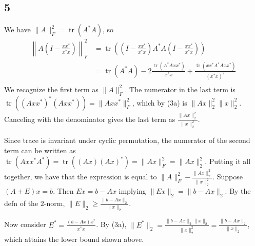 \documentclass{article}
\DeclareMathOperator{\tr}{tr}
\begin{document}
\subsection*{5}
We have $\|A\|_F^2=\tr(A^*A)$, so
\begin{align*}
    \left\|A\left(I-\frac{xx^*}{x^*x}\right)\right\|_F^2&=\tr\left(\left(I-\frac{xx^*}{x^*x}\right)A^*A\left(I-\frac{xx^*}{x^*x}\right)\right)\\
                                                    &=\tr(A^*A)-2\frac{\tr(A^*Axx^*)}{x^*x}+\frac{\tr(xx^*A^*Axx^*)}{(x^*x)^2}\\
\end{align*}
We recognize the first term as $\|A\|_F^2$. The numerator in the last term is $\tr((Axx^*)^*(Axx^*))=\|Axx^*\|_F^2$, which by (3a) is $\|Ax\|_2^2\|x\|_2^2$. Canceling with the denominator gives the last term as $\frac{\|Ax\|_2^2}{\|x\|_2^2}$.

Since trace is invariant under cyclic permutation, the numerator of the second term can be written as $\tr(Axx^*A^*)=\tr((Ax)(Ax)^*)=\|Ax\|_F^2=\|Ax\|_2^2$. Putting it all together, we have that the expression is equal to $\|A\|_F^2-\frac{\|Ax\|_2^2}{\|x\|_2^2}$.
Suppose $(A+E)x=b$. Then $Ex=b-Ax$ implying $\|Ex\|_2=\|b-Ax\|_2$. By the defn of the $2$-norm, $\|E\|_2\geq\frac{\|b-Ax\|_2}{\|x\|_2}$. 

Now consider $E^*=\frac{(b-Ax)x^*}{x^*x}$. By (3a), $\|E^*\|_2=\frac{\|b-Ax\|_2\|x\|_2}{\|x\|_2^2}=\frac{\|b-Ax\|_2}{\|x\|_2}$, which attains the lower bound shown above. 
\end{document}
